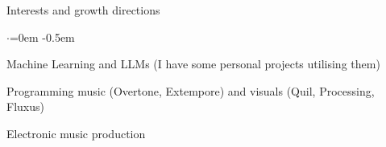 \documentclass{resume} %
\begin{document}

\begin{rSection}{Interests and growth directions}
  \smallskip
  \begin{list}{$\cdot$}{\leftmargin=0em} %
    \itemsep -0.5em \vspace{-0.5em} %
  \item Machine Learning and LLMs (I have some personal projects utilising them)
  \item Programming music (Overtone, Extempore) and visuals (Quil, Processing, Fluxus)
  \item Electronic music production
  \end{list}
\end{rSection}

\end{document}
